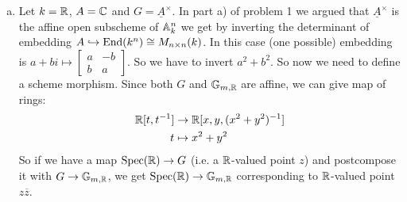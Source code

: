 \begin{exercise}{1}
\begin{enumerate}[a)]
{            }
        \item{
                Let $k = \mathbb{R}$, $A = \mathbb{C}$ and $G = \underline{A}^\times$.
                In part a) of problem 1 we argued that $\underline{A}^\times$ is
                the affine open subscheme of $\mathbb{A}^n_k$ we get by inverting the
                determinant of embedding $A \hookrightarrow \operatorname{End}(k^n) \cong M_{n
                \times n}(k)$. In this case (one possible) embedding is $a + b i \mapsto
                \begin{bmatrix}
                    a & -b \\
                    b & a
                \end{bmatrix}.
                $
                So we have to invert $a^2 + b^2$.
                So now we need to define a scheme morphism. Since both $G$ and
                $\mathbb{G}_{m, \mathbb{R}}$ are affine, we can give map of rings:
                \begin{equation*}
                    \begin{split}
                        \mathbb{R}[t, t^{-1}] &\to \mathbb{R}[x, y, (x^2 + y^2)^{-1}] \\
                        t &\mapsto x^2 + y^2
                    \end{split}
                \end{equation*}
                So if we have a map $\operatorname{Spec}(\mathbb{R}) \to G$ (i.e. a $\mathbb{R}$-valued point
                $z$) and postcompose it with $G \to \mathbb{G}_{m, \mathbb{R}}$, we get
                $\operatorname{Spec}(\mathbb{R}) \to \mathbb{G}_{m, \mathbb{R}}$ corresponding to $\mathbb{R}$-valued
                point $z \overline{z}$.
            }
    \end{enumerate}
\end{exercise}


